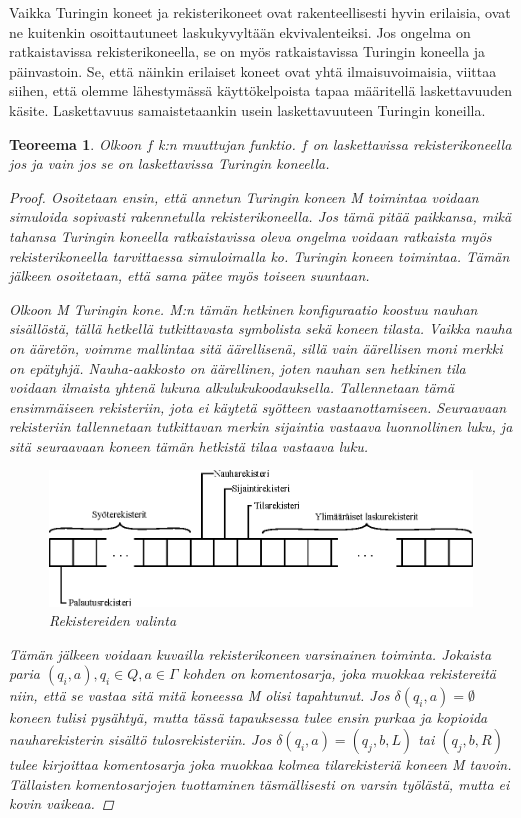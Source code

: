 \documentclass[a4paper, 12pt]{article}
\newtheorem{teor}{Teoreema}
\begin{document}
Vaikka Turingin koneet ja rekisterikoneet ovat rakenteellisesti hyvin erilaisia, ovat ne kuitenkin osoittautuneet laskukyvyltään ekvivalenteiksi. Jos ongelma on ratkaistavissa rekisterikoneella, se on myös ratkaistavissa Turingin koneella ja päinvastoin. Se, että näinkin erilaiset koneet ovat yhtä ilmaisuvoimaisia, viittaa siihen, että olemme lähestymässä käyttökelpoista tapaa määritellä laskettavuuden käsite. Laskettavuus samaistetaankin usein laskettavuuteen Turingin koneilla.

\begin{teor}
Olkoon $f$ k:n muuttujan funktio. $f$ on laskettavissa rekisterikoneella jos ja vain jos se on laskettavissa Turingin koneella.
\begin{proof}
Osoitetaan ensin, että annetun Turingin koneen M toimintaa voidaan simuloida sopivasti rakennetulla rekisterikoneella. Jos tämä pitää paikkansa, mikä tahansa Turingin koneella ratkaistavissa oleva ongelma voidaan ratkaista myös rekisterikoneella tarvittaessa simuloimalla ko. Turingin koneen toimintaa. Tämän jälkeen osoitetaan, että sama pätee myös toiseen suuntaan.

Olkoon M Turingin kone. M:n tämän hetkinen konfiguraatio koostuu nauhan sisällöstä, tällä hetkellä tutkittavasta symbolista sekä koneen tilasta. Vaikka nauha on ääretön, voimme mallintaa sitä äärellisenä, sillä vain äärellisen moni merkki on epätyhjä. Nauha-aakkosto on äärellinen, joten nauhan sen hetkinen tila voidaan ilmaista yhtenä lukuna alkulukukoodauksella. Tallennetaan tämä ensimmäiseen rekisteriin, jota ei käytetä syötteen vastaanottamiseen. Seuraavaan rekisteriin tallennetaan tutkittavan merkin sijaintia vastaava luonnollinen luku, ja sitä seuraavaan koneen tämän hetkistä tilaa vastaava luku.
\begin{figure}[H]
\centering
\includegraphics{graph5.eps}
\caption{Rekistereiden valinta}
\end{figure}
Tämän jälkeen voidaan kuvailla rekisterikoneen varsinainen toiminta. Jokaista paria $(q_i, a), q_i \in Q, a \in \Gamma$ kohden on komentosarja, joka muokkaa rekistereitä niin, että se vastaa sitä mitä koneessa M olisi tapahtunut. Jos $\delta(q_i, a) = \emptyset$ koneen tulisi pysähtyä, mutta tässä tapauksessa tulee ensin purkaa ja kopioida nauharekisterin sisältö tulosrekisteriin. Jos $\delta(q_i, a) = (q_j, b, L)$ tai $(q_j, b, R)$ tulee kirjoittaa komentosarja joka muokkaa kolmea tilarekisteriä koneen M tavoin. Tällaisten komentosarjojen tuottaminen täsmällisesti on varsin työlästä, mutta ei kovin vaikeaa.


\end{proof}
\end{teor}
\end{document}
